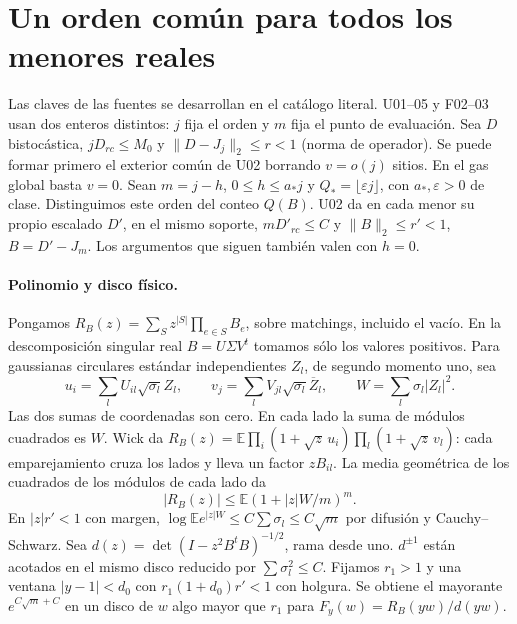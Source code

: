 \section{Un orden común para todos los menores reales}
Las claves de las fuentes se desarrollan en el catálogo literal. U01--05 y F02--03
usan dos enteros distintos: $j$ fija el orden y $m$ fija el punto de evaluación.
Sea $D$ bistocástica, $jD_{rc}\le M_0$ y $\|D-J_j\|_2\le r<1$ (norma de operador).
Se puede formar primero el exterior común de U02 borrando $v=o(j)$ sitios.
En el gas global basta $v=0$. Sean $m=j-h$, $0\le h\le a_*j$ y
$Q_*=\lfloor\varepsilon j\rfloor$, con $a_*,\varepsilon>0$ de clase. Distinguimos
este orden del conteo $Q(B)$. U02 da en cada menor su propio escalado $D'$,
en el mismo soporte, $mD'_{rc}\le C$ y $\|B\|_2\le r'<1$, $B=D'-J_m$.
Los argumentos que siguen también valen con $h=0$.

\paragraph{Polinomio y disco físico.}
Pongamos $R_B(z)=\sum_S z^{|S|}\prod_{e\in S}B_e$, sobre matchings, incluido el vacío.
En la descomposición singular real $B=U\Sigma V^t$ tomamos sólo los valores positivos.
Para gaussianas circulares estándar independientes $Z_l$, de segundo momento uno, sea
\[
 u_i=\sum_l U_{il}\sqrt{\sigma_l} Z_l,\qquad
 v_j=\sum_l V_{jl}\sqrt{\sigma_l}\overline Z_l,\qquad W=\sum_l\sigma_l|Z_l|^2.
\]
Las dos sumas de coordenadas son cero. En cada lado la suma de módulos cuadrados es $W$.
Wick da $R_B(z)=\mathbb E\prod_i(1+\sqrt z\,u_i)\prod_l(1+\sqrt z\,v_l)$:
cada emparejamiento cruza los lados y lleva un factor $zB_{il}$.
La media geométrica de los cuadrados de los módulos de cada lado da
\[
 |R_B(z)|\le\mathbb E(1+|z|W/m)^m .
\]
En $|z|r'<1$ con margen, $\log\mathbb E e^{|z|W}\le C\sum\sigma_l\le C\sqrt m$
por difusión y Cauchy--Schwarz. Sea $d(z)=\det(I-z^2B^tB)^{-1/2}$, rama desde uno.
$d^{\pm1}$ están acotados en el mismo disco reducido por $\sum\sigma_l^2\le C$.
Fijamos $r_1>1$ y una ventana $|y-1|<d_0$ con $r_1(1+d_0)r'<1$ con holgura.
Se obtiene el mayorante $e^{C\sqrt m+C}$ en un disco de $w$ algo mayor que $r_1$
para $F_y(w)=R_B(yw)/d(yw)$.

